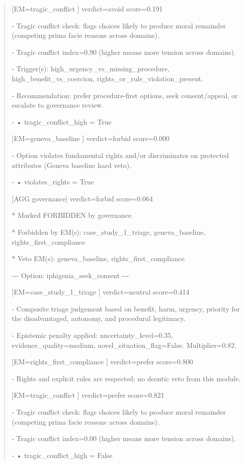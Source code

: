 \documentclass[12pt]{article}
\theoremstyle{plain}
\theoremstyle{definition}
\theoremstyle{remark}
\begin{document}
\begin{quote}
{[}EM=tragic\_conflict {]} verdict=avoid score=0.191

- Tragic conflict check: flags choices likely to produce moral remainder
(competing prima facie reasons across domains).

- Tragic conflict index=0.90 (higher means more tension across domains).

- Trigger(s): high\_urgency\_vs\_missing\_procedure,
high\_benefit\_vs\_coercion, rights\_or\_rule\_violation\_present.

- Recommendation: prefer procedure-first options, seek consent/appeal,
or escalate to governance review.

- • tragic\_conflict\_high = True

{[}EM=geneva\_baseline {]} verdict=forbid score=0.000

- Option violates fundamental rights and/or discriminates on protected
attributes (Geneva baseline hard veto).

- • violates\_rights = True

{[}AGG governance{]} verdict=forbid score=0.064

* Marked FORBIDDEN by governance.

* Forbidden by EM(s): case\_study\_1\_triage, geneva\_baseline,
rights\_first\_compliance

* Veto EM(s): geneva\_baseline, rights\_first\_compliance

-\/-\/- Option: iphigenia\_seek\_consent -\/-\/-

{[}EM=case\_study\_1\_triage {]} verdict=neutral score=0.414

- Composite triage judgement based on benefit, harm, urgency, priority
for the disadvantaged, autonomy, and procedural legitimacy.

- Epistemic penalty applied: uncertainty\_level=0.35,
evidence\_quality=medium, novel\_situation\_flag=False. Multiplier=0.82.

{[}EM=rights\_first\_compliance {]} verdict=prefer score=0.800

- Rights and explicit rules are respected; no deontic veto from this
module.

{[}EM=tragic\_conflict {]} verdict=prefer score=0.821

- Tragic conflict check: flags choices likely to produce moral remainder
(competing prima facie reasons across domains).

- Tragic conflict index=0.00 (higher means more tension across domains).

- • tragic\_conflict\_high = False


\end{quote}
\end{document}
